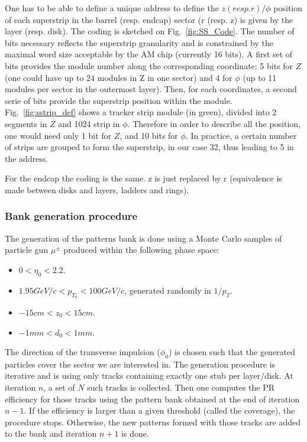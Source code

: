 \noindent One has to be able to define a unique address to define the $z (resp. r)/\phi$ position of each superstrip in the barrel (resp. endcap) sector (r (resp. z) is given by the layer (resp. disk). The coding is sketched on Fig.~\ref{fig:SS_Code}. The number of bits necessary reflects the superstrip granularity and is constrained by the maximal word size acceptable by the AM chip (currently 16 bits). A first set of bits provides the module number along the corresponding coordinate: 5 bits for $Z$ (one could have up to 24 modules in Z in one sector) and 4 for $\phi$ (up to 11 modules per sector in the outermost layer). Then, for each coordinates, a second serie of bits provide the superstrip position within the module. Fig.~\ref{fig:sstrip_def} shows a tracker strip module (in green), divided into 2 segments in $Z$ and 1024 strip in $\phi$. Therefore in order to describe all the position, one would need only 1 bit for $Z$, and 10 bits for $\phi$. In practice, a certain number of strips are grouped to form the superstrip, in our case 32, thus leading to 5 in the address.   

\noindent For the endcap the coding is the same. z is just replaced by r (equivalence is made between disks and layers, ladders and rings). 

\subsubsection{Bank generation procedure}

\noindent The generation of the patterns bank is done using a Monte Carlo samples of particle gun $\mu^{\pm}$ produced within the following phase space:
\begin{itemize}
\item $0 < \eta_0 < 2.2$.
\item $1.95GeV/c < p_{T_0} < 100GeV/c$, generated randomly in $1/p_T$.
\item $-15cm < z_0 < 15cm$.
 \item $-1mm < d_0 < 1mm$.
\end{itemize}  

\noindent The direction of the transverse impulsion ($\phi_0$) is chosen such that the generated particles cover the sector we are interested in. The generation procedure is iterative and is using only tracks containing exactly one stub per layer/disk. At iteration $n$, a set of $N$ such tracks is collected. Then one computes the PR efficiency for those tracks using the pattern bank obtained at the end of iteration $n-1$. If the efficiency is larger than a given threshold (called the coverage), the procedure stops. Otherwise, the new patterns formed with those tracks are added to the bank and iteration $n+1$ is done. 

